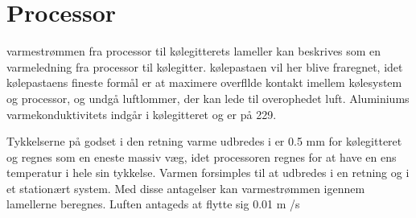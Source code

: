 \section{Processor}
varmestrømmen fra processor til kølegitterets lameller kan beskrives som en varmeledning fra processor til kølegitter. 
kølepastaen vil her blive fraregnet, idet kølepastaens fineste formål er at maximere overfllde kontakt imellem kølesystem og processor, og undgå luftlommer, der kan lede til overophedet luft. 
Aluminiums varmekonduktivitets indgår i kølegitteret og er på 229. 

Tykkelserne på godset i den retning varme udbredes i er 0.5 mm for kølegitteret og regnes som en eneste massiv væg, idet processoren regnes for at have en ens temperatur i hele sin tykkelse. Varmen forsimples til at udbredes i en retning og i et stationært system.  Med disse antagelser kan varmestrømmen igennem lamellerne beregnes.
Luften antageds at flytte sig 0.01 m /s